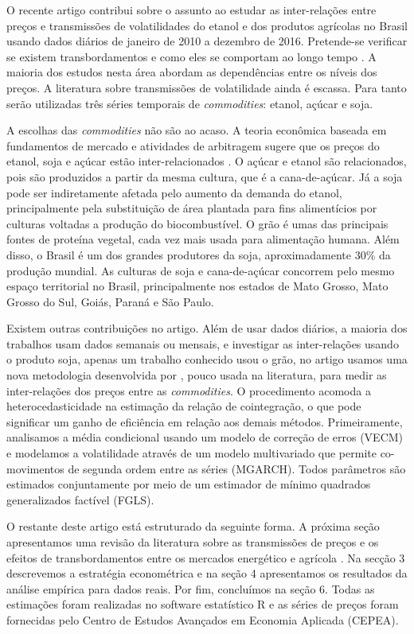 O recente artigo contribui sobre o assunto ao estudar as inter-relações  entre preços e transmissões de volatilidades do etanol e dos produtos agrícolas no Brasil usando dados diários de janeiro de 2010 a dezembro de 2016. Pretende-se verificar se existem transbordamentos e como eles se comportam ao longo tempo . A maioria dos estudos nesta área abordam as dependências entre os níveis dos preços. A literatura sobre transmissões de volatilidade ainda é escassa. Para tanto serão utilizadas três séries temporais de \emph{commodities}: etanol, açúcar e soja. 

A escolhas das \emph{commodities} não são ao acaso. A teoria econômica baseada em fundamentos de mercado e atividades de arbitragem sugere que os preços do etanol, soja e açúcar estão inter-relacionados \cite{de_gorter_welfare_2007}. O açúcar e etanol são relacionados, pois são produzidos a partir da mesma cultura, que é a cana-de-açúcar. Já a soja pode ser indiretamente  afetada pelo aumento da demanda do etanol, principalmente pela substituição de área plantada para fins alimentícios por culturas voltadas a produção do biocombustível.  O grão é umas das principais fontes de proteína vegetal, cada vez mais usada para alimentação humana.  Além disso, o Brasil é um dos grandes produtores da soja, aproximadamente 30\% da produção mundial. As culturas de soja e cana-de-açúcar  concorrem pelo mesmo espaço territorial no Brasil, principalmente nos estados de Mato Grosso, Mato Grosso do Sul, Goiás, Paraná e São Paulo. 

Existem outras contribuições no artigo. Além de usar dados diários, a maioria dos trabalhos usam dados semanais ou mensais, e investigar as inter-relações usando o produto soja, apenas um trabalho conhecido usou o grão, no artigo usamos uma nova metodologia desenvolvida  por  , pouco usada na literatura, para medir as inter-relações dos preços entre as \emph{commodities}. O procedimento  acomoda a heterocedasticidade na estimação da relação de cointegração, o que pode significar um ganho de eficiência em relação aos demais métodos. Primeiramente,  analisamos a média condicional usando um modelo de correção de erros (VECM) e modelamos a  volatilidade através de um modelo multivariado que permite co-movimentos de segunda ordem entre as séries (MGARCH).  Todos parâmetros  são estimados conjuntamente por meio de um estimador de mínimo quadrados generalizados factível (FGLS).

O restante deste artigo está estruturado da seguinte forma. A próxima seção apresentamos uma revisão da literatura sobre as transmissões de preços e os efeitos de transbordamentos entre os mercados energético e agrícola . Na secção 3 descrevemos  a estratégia econométrica e na seção 4 apresentamos os resultados da análise empírica para dados reais. Por fim, concluímos na seção 6. Todas as estimações foram realizadas no software estatístico R e as séries de preços foram fornecidas pelo Centro de Estudos Avançados em Economia Aplicada (CEPEA).